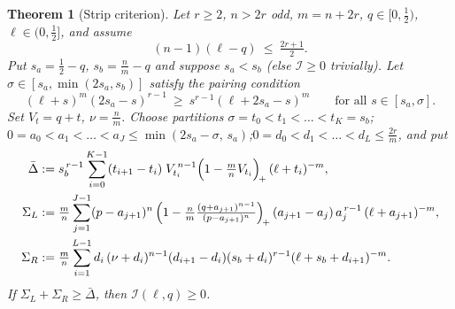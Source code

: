 \documentclass[11pt]{article}
\newtheorem{theorem}{Theorem}[section]
\begin{document}
\begin{theorem}[Strip criterion]\label{thm:strip-criterion}
Let $r\ge2$, $n>2r$ odd, $m=n+2r$, $q\in[0,\tfrac12)$, $\ell\in(0,\tfrac12]$, and assume
\begin{equation}\label{eq:val}
        (n-1)(\ell-q)\ \le\ \tfrac{2r+1}2 .
\end{equation}
Put $s_a=\tfrac12-q$, $s_b=\tfrac nm-q$ and suppose $s_a<s_b$ (else $\mathcal I\ge0$ trivially).  Let $\sigma\in[s_a,\min(2s_a,s_b)]$ satisfy the pairing condition
\begin{equation}\label{eq:Z}
        (\ell+s)^m(2s_a-s)^{r-1}\ \ge\ s^{r-1}(\ell+2s_a-s)^m
        \qquad\text{for all } s\in[s_a,\sigma].\tag{Z}
\end{equation}
Set $V_t=q+t$, $\nu=\tfrac nm$.  Choose partitions
$\sigma=t_0<t_1<\dots<t_K=s_b$;\quad $0=a_0<a_1<\dots<a_J\le\min(2s_a-\sigma,\,s_a)$;\quad $0=d_0<d_1<\dots<d_L\le\tfrac{2r}m$, and put
\begin{align*}
        \bar\Delta&:=s_b^{\,r-1}\sum_{i=0}^{K-1}(t_{i+1}-t_i)\;V_{t_i}^{\,n-1}\Bigl(1-\tfrac mnV_{t_i}\Bigr)_{\!+}\,(\ell+t_i)^{-m},\\
        \Sigma_L&:=\tfrac mn\sum_{j=1}^{J-1}(p-a_{j+1})^n\,\Bigl(1-\tfrac nm\tfrac{(q+a_{j+1})^{n-1}}{(p-a_{j+1})^n}\Bigr)_{\!+}\,(a_{j+1}-a_j)\,a_j^{\,r-1}\,(\ell+a_{j+1})^{-m},\\
        \Sigma_R&:=\tfrac mn\sum_{i=1}^{L-1}d_i\,(\nu+d_i)^{n-1}(d_{i+1}-d_i)(s_b+d_i)^{r-1}(\ell+s_b+d_{i+1})^{-m}.
\end{align*}
If $\Sigma_L+\Sigma_R\ge\bar\Delta$, then $\mathcal I(\ell,q)\ge0$.
\end{theorem}
\end{document}
